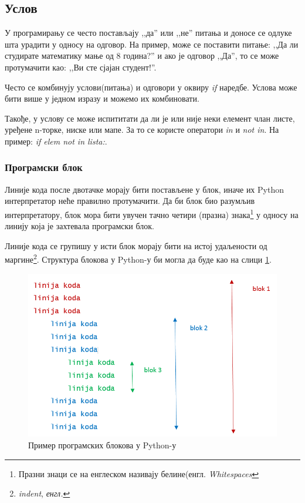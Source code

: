 \subsection{Услов}

У програмирању се често постављају ,,да'' или ,,не'' питања и доносе се одлуке шта урадити у односу на одговор. На пример, може се поставити питање: ,,Да ли студирате математику мање од 8 година?'' и ако је одговор ,,Да'', то се може протумачити као: ,,Ви сте сјајан студент!''.

Често се комбинују услови(питања) и одговори у оквиру \emph{if} наредбе. Услова може бити више у једном изразу и можемо их комбиновати.

Такође, у услову се може испититати да ли је или није неки елемент члан листе, уређене n-торке, ниске или мапе.  За то се користе оператори \emph{in} и \emph{not in}. На пример: \emph{if elem not in lista:}.

\subsubsection{Програмски блок}

Линије кода после двотачке морају бити постављене у блок, иначе их Python интерпретатор неће правилно протумачити. Да би блок био разумљив интерпретатору, блок мора бити увучен тачно четири (празна) знака\footnote{Празни знаци се на енглеском називају белине(енгл. \emph{Whitespaces}}  у односу на линију која је захтевала програмски блок\cite{PEP}.

Линије кода се групишу у исти блок морају бити на истој удаљености од маргине\footnote{\emph{indent}, \emph{енгл.}}. Структура блокова у Python-у би могла да буде као на слици \ref{slike:whitespace}.

\begin{figure}[here]
\centering
\includegraphics[scale=0.5]{whitespace.png}
\caption{Пример програмских блокова у Python-у}
\label{slike:whitespace}
\end{figure}

